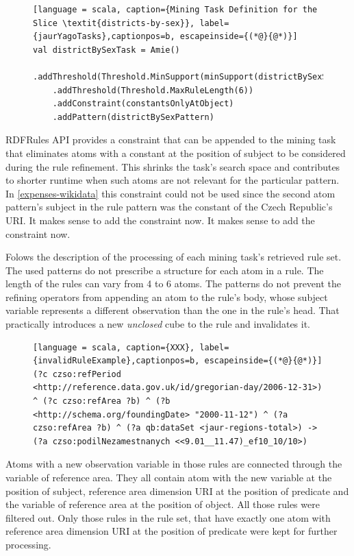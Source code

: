 \begin{figure}[h]
\begin{lstlisting}[language = scala, caption={Mining Task Definition for the Slice \textit{districts-by-sex}}, label={jaurYagoTasks},captionpos=b, escapeinside={(*@}{@*)}]
val districtBySexTask = Amie()
    .addThreshold(Threshold.MinSupport(minSupport(districtBySexSlice)*3))
    .addThreshold(Threshold.MaxRuleLength(6))
    .addConstraint(constantsOnlyAtObject)
    .addPattern(districtBySexPattern)
\end{lstlisting}
\end{figure}

RDFRules API provides a constraint that can be appended to the mining task that eliminates atoms with a constant at the position of subject to be considered during the rule refinement. This shrinks the task's search space and contributes to shorter runtime when such atoms are not relevant for the particular pattern. In \ref{expenses-wikidata} this constraint could not be used since the second atom pattern's subject in the rule pattern was the constant of the Czech Republic's URI. It makes sense to add the constraint now. It makes sense to add the constraint now.

Folows the description of the processing of each mining task's retrieved rule set. The used patterns do not prescribe a structure for each atom in a rule. The length of the rules can vary from 4 to 6 atoms. The patterns do not prevent the refining operators from appending an atom to the rule's body, whose subject variable represents a different observation than the one in the rule's head. That practically introduces a new \textit{unclosed} cube to the rule and invalidates it.

\begin{figure}[h]
\begin{lstlisting}[language = scala, caption={XXX}, label={invalidRuleExample},captionpos=b, escapeinside={(*@}{@*)}]
(?c czso:refPeriod <http://reference.data.gov.uk/id/gregorian-day/2006-12-31>) ^ (?c czso:refArea ?b) ^ (?b <http://schema.org/foundingDate> "2000-11-12") ^ (?a czso:refArea ?b) ^ (?a qb:dataSet <jaur-regions-total>) -> (?a czso:podilNezamestnanych <<9.01__11.47)_ef10_10/10>)
\end{lstlisting}
\end{figure}

Atoms with a new observation variable in those rules are connected through the variable of reference area. They all contain atom with the new variable at the position of subject, reference area dimension URI at the position of predicate and the variable of reference area at the position of object. All those rules were filtered out. Only those rules in the rule set, that have exactly one atom with reference area dimension URI at the position of predicate were kept for further processing.

